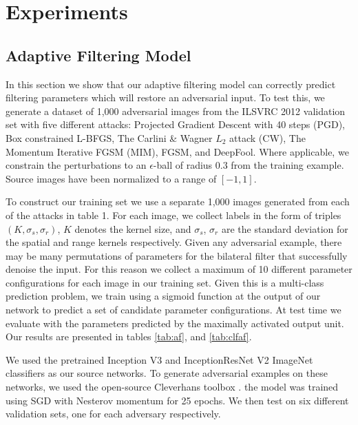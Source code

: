 \documentclass{article} %
\begin{document}
\section{Experiments}

\subsection{Adaptive Filtering Model}
In this section we show that our adaptive filtering model can correctly predict filtering parameters which will restore an adversarial input. To test this, we generate a dataset of 1,000 adversarial images from the ILSVRC 2012 validation set with five different attacks: Projected Gradient Descent with 40 steps (PGD), Box constrained L-BFGS, The Carlini \& Wagner $L_2$ attack (CW), The Momentum Iterative FGSM (MIM), FGSM, and DeepFool.
Where applicable, we constrain the perturbations to an $\epsilon$-ball of radius $0.3$ from the training example. Source images have been normalized to a range of $[-1, 1]$.

To construct our training set we use a separate 1,000 images generated from each of the attacks in table 1. For each image, we collect labels in the form of triples $(K, \sigma_s, \sigma_r)$, $K$ denotes the kernel size, and $\sigma_s$, $\sigma_r$ are the standard deviation for the spatial and range kernels respectively. Given any adversarial example, there may be many permutations of parameters for the bilateral filter that successfully denoise the input. For this reason we collect a maximum of 10 different parameter configurations for each image in our training set. Given this is a multi-class prediction problem, we train using a sigmoid function at the output of our network to predict a set of candidate parameter configurations. At test time we evaluate with the parameters predicted by the maximally activated output unit. Our results are presented in tables \ref{tab:af}, and \ref{tab:clfaf}. 

We used the pretrained Inception V3 \citep{szegedy2016rethinking} and InceptionResNet V2 \citep{szegedy2017inception} ImageNet classifiers as our source networks. To generate adversarial examples on these networks, we used the open-source Cleverhans toolbox \citep{papernot2016cleverhans}.
the model was trained using SGD with Nesterov momentum for 25 epochs. We then test on six different validation sets, one for each adversary respectively. 
\end{document}

